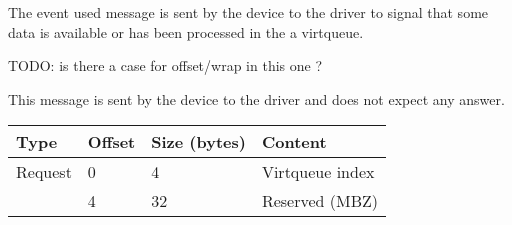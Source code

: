 
The event used message is sent by the device to the driver to signal that some
data is available or has been processed in the a virtqueue.

TODO: is there a case for offset/wrap in this one ?

This message is sent by the device to the driver and does not expect any
answer.

\begin{tabular}{|l|l|l|l|}
\hline
Type & Offset & Size (bytes) & Content \\
\hline \hline
Request & 0 & 4 & Virtqueue index \\
& 4 & 32 & Reserved (MBZ) \\
\hline
\end{tabular}

